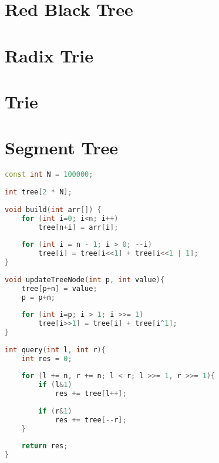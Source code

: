 \section{Red Black Tree}
\section{Radix Trie}
\section{Trie}
\section{Segment Tree}
\begin{lstlisting}[language=C++, title={Implementação Eficiente}]
const int N = 100000; 
 
int tree[2 * N];
 
void build(int arr[]) {
    for (int i=0; i<n; i++)    
        tree[n+i] = arr[i];
     
    for (int i = n - 1; i > 0; --i)     
        tree[i] = tree[i<<1] + tree[i<<1 | 1];    
}
 
void updateTreeNode(int p, int value){ 
    tree[p+n] = value;
    p = p+n;
     
    for (int i=p; i > 1; i >>= 1)
        tree[i>>1] = tree[i] + tree[i^1];
}
 
int query(int l, int r){ 
    int res = 0;
     
    for (l += n, r += n; l < r; l >>= 1, r >>= 1){
        if (l&1) 
            res += tree[l++];
     
        if (r&1) 
            res += tree[--r];
    }
     
    return res;
}
\end{lstlisting}
\newpage
